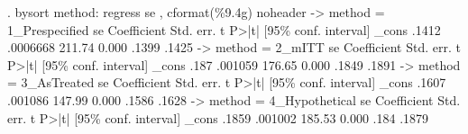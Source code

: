 . bysort method: regress se , cformat(\%9.4g) noheader
{\smallskip}
-> method = 1_Prespecified
          se {\VBAR} Coefficient  Std. err.      t    P>|t|     [95\% conf. interval]
       _cons {\VBAR}      .1412   .0006668   211.74   0.000        .1399       .1425
{\smallskip}
-> method = 2_mITT
          se {\VBAR} Coefficient  Std. err.      t    P>|t|     [95\% conf. interval]
       _cons {\VBAR}       .187    .001059   176.65   0.000        .1849       .1891
{\smallskip}
-> method = 3_AsTreated
          se {\VBAR} Coefficient  Std. err.      t    P>|t|     [95\% conf. interval]
       _cons {\VBAR}      .1607    .001086   147.99   0.000        .1586       .1628
{\smallskip}
-> method = 4_Hypothetical
          se {\VBAR} Coefficient  Std. err.      t    P>|t|     [95\% conf. interval]
       _cons {\VBAR}      .1859    .001002   185.53   0.000         .184       .1879
